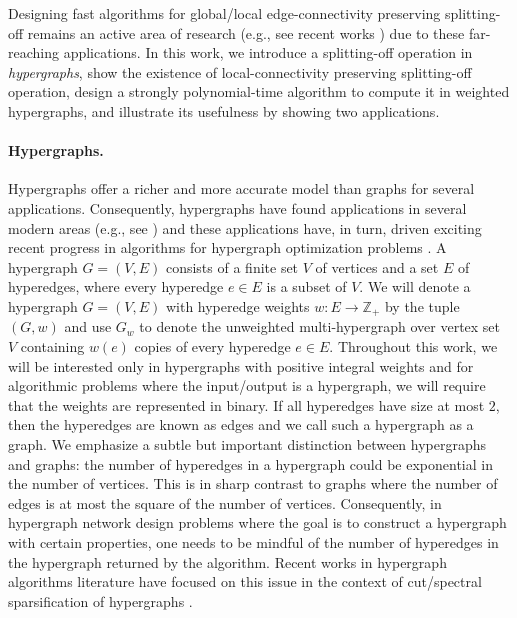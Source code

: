 \documentclass{article}
\providecommand{\Z}{\mathbb{Z}}
\begin{document}
Designing fast algorithms for global/local edge-connectivity preserving splitting-off remains an active area of research (e.g., see recent works \cite{LY13, CLP22-soda, CLP22-stoc, CHLP23}) due to these far-reaching applications. 
In this work, we introduce a splitting-off operation in \emph{hypergraphs}, show the existence of local-connectivity preserving splitting-off operation, design a strongly polynomial-time algorithm to compute it in weighted hypergraphs, and illustrate its usefulness by showing two applications. 

\paragraph{Hypergraphs.}
Hypergraphs offer a richer and more accurate model than graphs for several applications. 
Consequently, hypergraphs have found applications in several modern areas (e.g., see \cite{VeldtBK22,Schlagetal23,LiM17, Ornes21}) and these applications have, in turn, driven exciting recent progress in algorithms for hypergraph optimization problems \cite{KK15, GKP17, CXY19-j, CX18, CC22, CKN20, SY19, BST19, KKTY21-FOCS, KKTY21-STOC, Lee22, JLS22, Quanrud22, GLSTW22, CC23, AGL23, FPZ23}. 
A hypergraph $G=(V, E)$ consists of a finite set $V$ of vertices and a set $E$ of hyperedges, where every hyperedge $e\in E$ is a subset of $V$. We will denote a hypergraph $G=(V, E)$ with hyperedge weights $w: E\rightarrow \Z_+$ by the tuple $(G, w)$ and use $G_w$ to denote the unweighted multi-hypergraph over vertex set $V$ containing $w(e)$ copies of every hyperedge $e\in E$.  
Throughout this work, we will be interested only in hypergraphs with positive integral weights and for algorithmic problems where the input/output is a hypergraph, we will require that the weights are represented in binary. 
If all hyperedges have size at most $2$, then the hyperedges are known as edges and we call such a hypergraph as a graph. 
We emphasize a subtle but important distinction between hypergraphs and graphs: the number of hyperedges in a hypergraph could be exponential in the number of vertices. This is in sharp contrast to graphs where the number of edges is at most the square of the number of vertices. Consequently, in hypergraph network design problems where the goal is to construct a hypergraph with certain properties,  
one needs to be mindful of the number of hyperedges in the hypergraph returned by the algorithm. %
Recent works in hypergraph algorithms literature have 
focused on this 
issue in the context of cut/spectral sparsification of hypergraphs \cite{KK15, CX18, SY19, BST19, CKN20, KKTY21-FOCS, KKTY21-STOC, Lee22, JLS22, Quanrud22}. 
\end{document}
